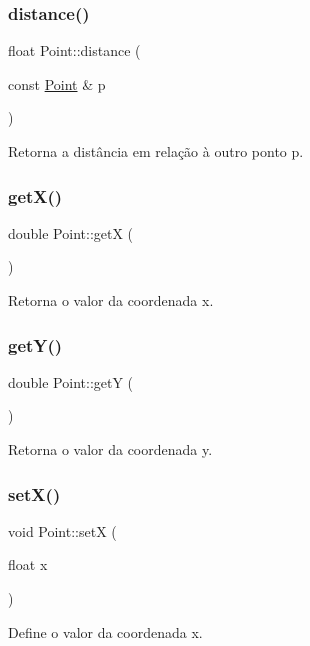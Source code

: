 \subsubsection{\texorpdfstring{distance()}{distance()}}
{\footnotesize\ttfamily float Point\+::distance (\begin{DoxyParamCaption}\item[{const \hyperlink{class_point}{Point} \&}]{p }\end{DoxyParamCaption})}

Retorna a distância em relação à outro ponto p. \mbox{\label{class_point_a8de35a6098cdd7267b4167776da83da6}} 
\subsubsection{\texorpdfstring{get\+X()}{getX()}}
{\footnotesize\ttfamily double Point\+::getX (\begin{DoxyParamCaption}{ }\end{DoxyParamCaption})}

Retorna o valor da coordenada x. \mbox{\label{class_point_aa278c8bcb8aeb4101023a4baf473b547}} 
\subsubsection{\texorpdfstring{get\+Y()}{getY()}}
{\footnotesize\ttfamily double Point\+::getY (\begin{DoxyParamCaption}{ }\end{DoxyParamCaption})}

Retorna o valor da coordenada y. \mbox{\label{class_point_a61253b28283b54a9cf379132bdff3006}} 
\subsubsection{\texorpdfstring{set\+X()}{setX()}}
{\footnotesize\ttfamily void Point\+::setX (\begin{DoxyParamCaption}\item[{float}]{x }\end{DoxyParamCaption})}

Define o valor da coordenada x. \mbox{\label{class_point_ae456513d2af9dec336514a94e350a386}} 
